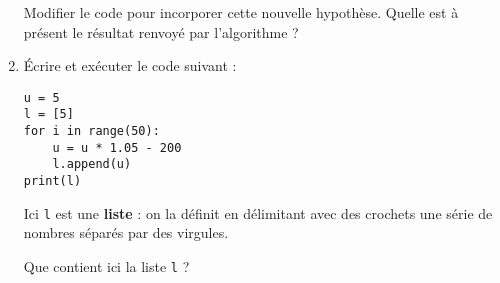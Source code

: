 \documentclass[
	classe=$1^{ere}STI2D$
]{informatique}
\begin{document}
\begin{enumerate}
	      Modifier le code pour incorporer cette nouvelle hypothèse. Quelle est à présent le résultat renvoyé par l'algorithme ? 
	\item Écrire et exécuter le code suivant :
	      \begin{center}
		      \begin{lstlisting}
u = 5
l = [5]
for i in range(50):
    u = u * 1.05 - 200
	l.append(u)
print(l)
\end{lstlisting}
	      \end{center}

	      Ici \texttt{l} est une \textbf{liste} : on la définit en délimitant avec des crochets une série de nombres séparés par des virgules.

	      Que contient ici la liste \texttt{l} ? 
\end{enumerate}
\end{document}
